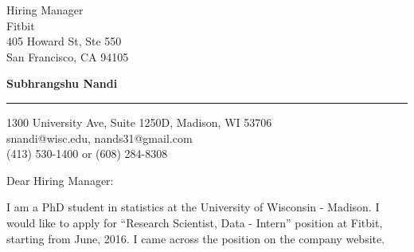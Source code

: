 \documentclass{letter} %
\begin{document}
\signature{Subhrangshu Nandi}           %
\longindentation=0pt                       %
\let\raggedleft\raggedright                %
 
 
\begin{letter}
{Hiring Manager \\
Fitbit \\
405 Howard St, Ste 550 \\
San Francisco, CA 94105
}


\begin{flushleft}
{\bf Subhrangshu Nandi}
\end{flushleft}
\medskip\hrule height 1pt
\begin{flushright}
\hfill 1300 University Ave, Suite 1250D, Madison, WI 53706 \\
\hfill snandi@wisc.edu, nands31@gmail.com\\
\hfill (413) 530-1400 or (608) 284-8308
\end{flushright} 
\vfill %

\opening{Dear Hiring Manager:} 
 
\noindent %
I am a PhD student in statistics at the University of Wisconsin - Madison. I would like to apply for ``Research Scientist, Data - Intern'' position at Fitbit, starting from June, 2016. I came across the position on the company website.
 

\end{letter}
\end{document}
